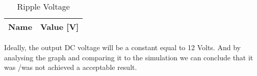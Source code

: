 \begin{table}[H]
  \centering
  \begin{tabular}{|l|r|}
     \hline    
    {\bf Name} & {\bf Value [V]} \\ \hline    
    
  \end{tabular}
  \caption{Ripple Voltage}
  \label{tab:ripple}
\end{table}

Ideally, the output DC voltage will be a constant equal to 12 Volts. And by analysing the graph and comparing it to the simulation we can conclude that it was /was not achieved a acceptable result.
